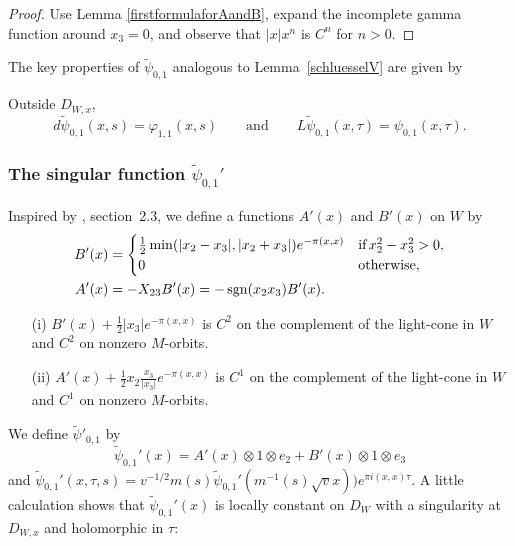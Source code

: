 \begin{proof} 
Use Lemma \ref{firstformulaforAandB},
expand the incomplete gamma function around $x_3=0$,
and observe that $|x|x^n$ is $C^n$ for $n>0$. 
\end{proof}





The key properties of $\tilde{\psi}_{0,1}$ analogous to Lemma~\ref{schluesselV} are given by 

\begin{lemma}\label{schluessel}
Outside $D_{W,x}$,
\[
d\tilde{\psi}_{0,1}(x,s) = \varphi_{1,1}(x,s) \qquad \text{and} \qquad 
L\tilde{\psi}_{0,1}(x,\tau) = \psi_{0,1}(x,\tau).
\]
\end{lemma}



\subsubsection{The singular function $\tilde{\psi}_{0,1}'$}



Inspired by \cite{HZ}, section~2.3, we define a functions $A'(x)$ and $B'(x)$ on $W$ by
\begin{align}\label{AB'-eq}
B'(x) &= \begin{cases} \frac12\min(|x_2-x_3|,|x_2+ x_3|)e^{- \pi (x,x)}  & \text{if}  \, x_2^2-x_3^2 >0,\\ 0 \  & \text{otherwise},
\end{cases} \\
A'(x) &= -X_{23}B'(x)=   -\operatorname{sgn}(x_2x_3)B'(x). \notag
\end{align}
 
 \begin{lemma}\label{singularitiesofA'andB'} 
\begin{enumerate}
\item[(i)] 
$B'(x) + \tfrac12|x_3|e^{- \pi (x,x)}$ is $C^2$ on the complement of the light-cone in $W$ and  $C^2$ on nonzero $M$-orbits.
 \item[(ii)] 
 $A'(x) + \tfrac12 x_2 \frac{x_3}{|x_3|}e^{- \pi (x,x)}$ is $C^1$ on the complement of the light-cone in $W$ and  $C^1$  on nonzero $M$-orbits.
 \end{enumerate}
\end{lemma}





We define $\tilde{\psi}'_{0,1}$ by
\[
\tilde{\psi}_{0,1}'(x) = A'(x) \otimes 1 \otimes e_2 +  B'(x) \otimes 1 \otimes e_3
\]
and $\tilde{\psi}_{0,1}'(x,\tau,s) = v^{-1/2} m(s) \tilde{\psi}_{0,1}'(m^{-1}(s)\sqrt{v}x)) e^{\pi i (x,x)\tau}$. A little calculation shows that $\tilde{\psi}_{0,1}'(x)$ is locally constant on $D_W$ with a singularity at $D_{W,x}$ and holomorphic in $\tau$:




